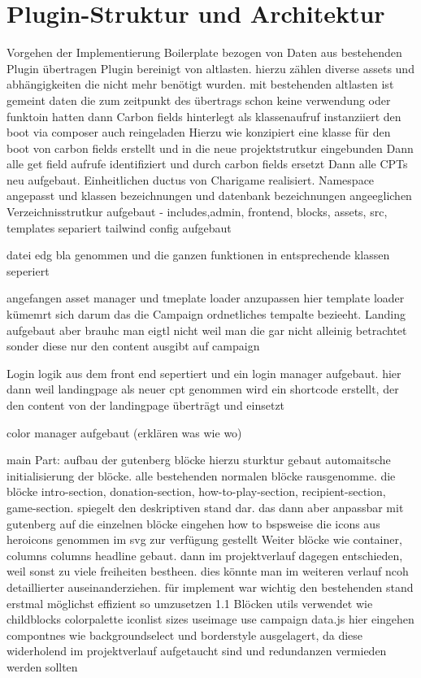 \section{Plugin-Struktur und Architektur}
Vorgehen der Implementierung
Boilerplate bezogen von %
Daten aus bestehenden Plugin übertragen
Plugin bereinigt von altlasten. hierzu zählen diverse assets und abhängigkeiten die nicht mehr benötigt wurden. mit bestehenden altlasten ist gemeint daten die zum zeitpunkt des übertrags schon keine verwendung oder funktoin hatten
dann
Carbon fields hinterlegt als klassenaufruf instanziiert den boot via composer auch reingeladen Hierzu wie konzipiert eine klasse für den boot von carbon fields erstellt und in die neue projektstrutkur eingebunden
Dann alle get field aufrufe identifiziert und durch carbon fields ersetzt
Dann alle CPTs neu aufgebaut. Einheitlichen ductus von Charigame realisiert.
Namespace angepasst und klassen bezeichnungen und datenbank bezeichnungen angeeglichen
Verzeichnisstrutkur aufgebaut - includes,admin, frontend, blocks, assets, src, templates separiert
tailwind config aufgebaut

datei edg bla genommen und die ganzen funktionen in entsprechende klassen seperiert

angefangen asset manager und tmeplate loader anzupassen
hier template loader kümemrt sich darum das die Campaign ordnetliches tempalte bezieeht. Landing aufgebaut aber brauhc man eigtl nicht weil man die gar nicht alleinig betrachtet sonder diese nur den content ausgibt auf campaign

Login logik aus dem front end sepertiert und ein login manager aufgebaut. hier dann weil landingpage als neuer cpt genommen wird ein shortcode erstellt, der den content von der landingpage überträgt und einsetzt

color manager aufgebaut (erklären was wie wo)



main Part: aufbau der gutenberg blöcke
hierzu sturktur gebaut automaitsche initialisierung der blöcke. alle bestehenden normalen blöcke rausgenomme.
die blöcke intro-section, donation-section, how-to-play-section, recipient-section, game-section. spiegelt den deskriptiven stand dar. das dann aber anpassbar mit gutenberg
auf die einzelnen blöcke eingehen
how to bspsweise die icons aus heroicons genommen im svg zur verfügung gestellt
Weiter blöcke wie container, columns columns headline gebaut. dann im projektverlauf dagegen entschieden, weil sonst zu viele freiheiten bestheen. dies könnte man im weiteren verlauf ncoh detaillierter auseinanderziehen.
für implement war wichtig den bestehenden stand erstmal möglichst effizient so umzusetzen 1.1
Blöcken utils verwendet wie childblocks colorpalette iconlist sizes useimage use campaign data.js hier eingehen
compontnes wie backgroundselect und borderstyle ausgelagert, da diese widerholend im projektverlauf aufgetaucht sind und redundanzen vermieden werden sollten

